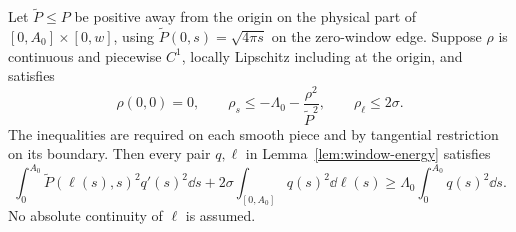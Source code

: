 \begin{lemma}\label{lem:bv-comparison}
Let $\widetilde P\le P$ be positive away from the origin on the physical part of $[0,A_0]\times[0,w]$, using $\widetilde P(0,s)=\sqrt{4\pi s}$ on the zero-window edge. Suppose $\rho$ is continuous and piecewise $C^1$, locally Lipschitz including at the origin, and satisfies
\begin{equation}\label{eq:rho}
 \rho(0,0)=0,\qquad
 \rho_s\le-\Lambda_0-\frac{\rho^2}{\widetilde P^2},\qquad
 \rho_\ell\le2\sigma.
\end{equation}
The inequalities are required on each smooth piece and by tangential restriction on its boundary. Then every pair $q,\ell$ in Lemma~\ref{lem:window-energy} satisfies
\[
 \int_0^{A_0}\widetilde P(\ell(s),s)^2q'(s)^2\dd s
 +2\sigma\int_{[0,A_0]}q(s)^2\dd\ell(s)
 \ge\Lambda_0\int_0^{A_0}q(s)^2\dd s.
\]
No absolute continuity of $\ell$ is assumed.
\end{lemma}
